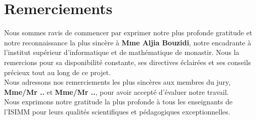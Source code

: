 \thispagestyle{empty}

\chapter*{Remerciements}

Nous sommes ravis de commencer par exprimer notre plus profonde gratitude et notre reconnaissance la plus sincère à \textbf{Mme Aljia Bouzidi}, notre encadrante à l'institut supérieur d'informatique et de mathématique de monastir. Nous la remercions pour sa disponibilité constante, ses directives éclairées et ses conseils précieux tout au long de ce projet.\\

Nous adressons nos remerciements les plus sincères aux membres du jury, \textbf{Mme/Mr ..} et \textbf{Mme/Mr ..}, pour avoir accepté d'évaluer notre travail.\\

Nous exprimons notre gratitude la plus profonde à tous les enseignants de l'ISIMM pour leurs qualités scientifiques et pédagogiques exceptionnelles.